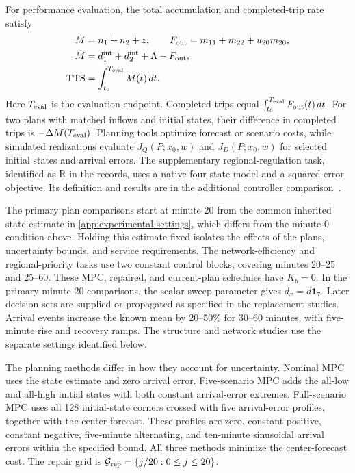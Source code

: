 \documentclass[preprint,12pt]{elsarticle}
\theoremstyle{definition}
\theoremstyle{plain}
\theoremstyle{definition}
\theoremstyle{plain}
\newcommand{\appref}[1]{\ref{#1}}
\newcommand{\reproductiondetails}[1]{\href{https://github.com/AlienEslami/agentic-perimeter-runtime-certification/releases/tag/paper-2026-11-10}{#1}~\cite{perimeterReproductionGuide}}
\begin{document}
For performance evaluation, the total accumulation and completed-trip
rate satisfy
\begin{equation}
\begin{aligned}
M&=n_1+n_2+z,\qquad F_{\rm out}=m_{11}+m_{22}+u_{20}m_{20},\\
\dot M&=d_1^{\rm int}+d_2^{\rm int}+\Lambda-F_{\rm out},\\
\mathrm{TTS}&=\int_{t_0}^{T_{\rm eval}}M(t)\,dt.
\end{aligned}
\label{eq:new-conservation}
\end{equation}
Here $T_{\rm eval}$ is the evaluation endpoint. Completed trips equal
$\int_{t_0}^{T_{\rm eval}}F_{\rm out}(t)\,dt$. For two plans with matched
inflows and initial states, their difference in completed trips is
$-\Delta M(T_{\rm eval})$. Planning tools optimize forecast or scenario
costs, while simulated realizations evaluate $J_Q(P;x_0,w)$ and
$J_D(P;x_0,w)$ for selected initial states and arrival errors.
The supplementary regional-regulation task, identified as R in the
records, uses a native four-state model and a squared-error objective.
Its definition and results are in the
\reproductiondetails{additional controller comparison}.

The primary plan comparisons start at minute 20 from the common inherited
state estimate in \appref{app:experimental-settings}, which differs from
the minute-0 condition above. Holding this estimate fixed isolates the
effects of the plans, uncertainty bounds, and service requirements.
The network-efficiency and regional-priority tasks use two constant
control blocks, covering minutes 20--25 and 25--60. These MPC, repaired,
and current-plan schedules have $K_b=0$. In the primary minute-20
comparisons, the scalar sweep parameter gives $d_x=d\mathbf1_7$.
Later decision sets are supplied or propagated as specified in the
replacement studies. Arrival events increase the known mean by 20--50\% for
30--60 minutes, with five-minute rise and recovery ramps. The structure
and network studies use the separate settings identified below.

The planning methods differ in how they account for uncertainty.
Nominal MPC uses the state estimate and zero arrival error.
Five-scenario MPC adds the all-low and all-high initial states with both
constant arrival-error extremes. Full-scenario MPC uses all 128 initial-state
corners crossed with five arrival-error profiles, together with the center
forecast. These profiles are zero, constant positive, constant negative,
five-minute alternating, and ten-minute sinusoidal arrival errors within the
specified bound. All three methods minimize the center-forecast cost.
The repair grid is
$\mathcal G_{\rm rep}=\{j/20:0\le j\le20\}$.
\end{document}
